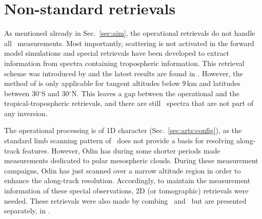\section{Non-standard retrievals}
\label{sec:nonstandard}
%
As mentioned already in Sec.~\ref{sec:aim}, the operational retrievals do not
handle all \smr\ measurements. Most importantly, scattering is not activated in
the forward model simulations and special retrievals have been developed to
extract information from spectra containing tropospheric information.
This retrieval scheme was introduced by \citet{rydberg:nonga:09} and the latest
results are found in \citet{eriksson:overw:14}. However, the method of
\citet{rydberg:nonga:09} is only applicable for tangent altitudes below 9\,km
and latitudes between 30$^\circ$S and 30$^\circ$N. This leaves a gap between
the operational and the tropical-tropospheric retrievals, and there are
still \smr\ spectra that are not part of any inversion. 

The operational processing is of 1D character (Sec.~\ref{sec:arts:config}), as
the standard limb scanning pattern of \smr\ does not provide a basis for
resolving along-track features. However, Odin has during some shorter periods
made measurements dedicated to polar mesospheric clouds. During these
measurement campaigns, Odin has just scanned over a narrow altitude region in
order to enhance the along-track resolution. Accordingly, to maintain the
measurement information of these special observations, 2D (or tomographic)
retrievals were needed. These retrievals were also made by combing \OEM\ and
\ARTS\ but are presented separately, in \citet{christensen:tomog:15}.



